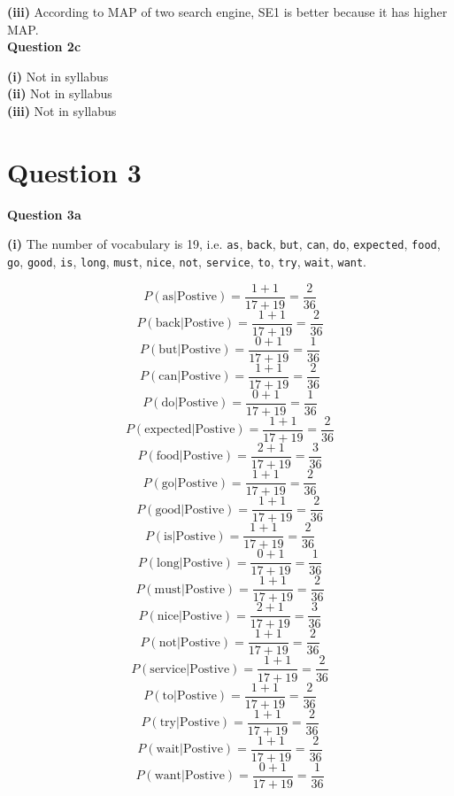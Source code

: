 \documentclass[11pt,a4paper]{report}
\begin{document}
\begin{multicols*}{2}
\noindent \textbf{(iii)} According to MAP of two search engine, SE1 is better because it has higher MAP. \\

\noindent \textbf{Question 2c}

\noindent \textbf{(i)} Not in syllabus\\

\noindent \textbf{(ii)} Not in syllabus\\

\noindent \textbf{(iii)} Not in syllabus

\section{Question 3}

\noindent \textbf{Question 3a}

\noindent \textbf{(i)} The number of vocabulary is 19, i.e. \verb|as|, \verb|back|, \verb|but|, \verb|can|, \verb|do|, \verb|expected|, \verb|food|, \verb|go|, \verb|good|, \verb|is|, \verb|long|, \verb|must|, \verb|nice|, \verb|not|, \verb|service|, \verb|to|, \verb|try|, \verb|wait|, \verb|want|.

$$ P(\text{as} | \text{Postive} ) = \frac{1+ 1}{17 + 19} = \frac{2}{36}$$
$$ P(\text{back} | \text{Postive} ) = \frac{1+ 1}{17 + 19} = \frac{2}{36}$$
$$ P(\text{but} | \text{Postive} ) = \frac{0+ 1}{17 + 19} = \frac{1}{36}$$
$$ P(\text{can} | \text{Postive} ) = \frac{1+ 1}{17 + 19} = \frac{2}{36}$$
$$ P(\text{do} | \text{Postive} ) = \frac{0+ 1}{17 + 19} = \frac{1}{36}$$
$$ P(\text{expected} | \text{Postive} ) = \frac{1+ 1}{17 + 19} = \frac{2}{36}$$
$$ P(\text{food} | \text{Postive} ) = \frac{2+ 1}{17 + 19} = \frac{3}{36}$$
$$ P(\text{go} | \text{Postive} ) = \frac{1+ 1}{17 + 19} = \frac{2}{36}$$
$$ P(\text{good} | \text{Postive} ) = \frac{1+ 1}{17 + 19} = \frac{2}{36}$$
$$ P(\text{is} | \text{Postive} ) = \frac{1+ 1}{17 + 19} = \frac{2}{36}$$
$$ P(\text{long} | \text{Postive} ) = \frac{0+ 1}{17 + 19} = \frac{1}{36}$$
$$ P(\text{must} | \text{Postive} ) = \frac{1+ 1}{17 + 19} = \frac{2}{36}$$
$$ P(\text{nice} | \text{Postive} ) = \frac{2+ 1}{17 + 19} = \frac{3}{36}$$
$$ P(\text{not} | \text{Postive} ) = \frac{1+ 1}{17 + 19} = \frac{2}{36}$$
$$ P(\text{service} | \text{Postive} ) = \frac{1+ 1}{17 + 19} = \frac{2}{36}$$
$$ P(\text{to} | \text{Postive} ) = \frac{1+ 1}{17 + 19} = \frac{2}{36}$$
$$ P(\text{try} | \text{Postive} ) = \frac{1+ 1}{17 + 19} = \frac{2}{36}$$
$$ P(\text{wait} | \text{Postive} ) = \frac{1+ 1}{17 + 19} = \frac{2}{36}$$
$$ P(\text{want} | \text{Postive} ) = \frac{0+ 1}{17 + 19} = \frac{1}{36}$$


\end{multicols*}
\end{document}

